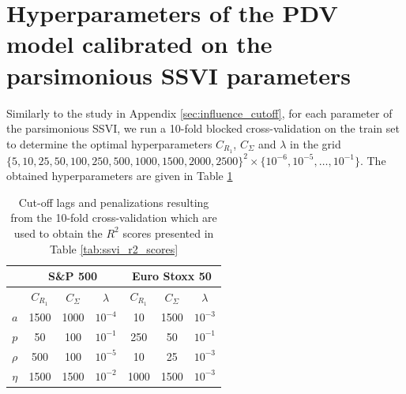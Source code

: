 \section{Hyperparameters of the PDV model calibrated on the parsimonious SSVI parameters}\label{sec:hyperparams_ssvi}
Similarly to the study in Appendix \ref{sec:influence_cutoff}, for each parameter of the parsimonious SSVI, we run a 10-fold blocked cross-validation on the train set to determine the optimal hyperparameters $C_{R_1}$, $C_{\Sigma}$ and $\lambda$ in the grid $\{5,10,25,50,100,250,500,1000,1500,2000,2500\}^2\times \{10^{-6},10^{-5},\dots,10^{-1}\}$. The obtained hyperparameters are given in Table \ref{tab:pssvi_hyperparameters}
\begin{table}[h]
    \centering
    \caption{Cut-off lags and penalizations resulting from the 10-fold cross-validation which are used to obtain the $R^2$ scores presented in Table \ref{tab:ssvi_r2_scores}}
    \label{tab:pssvi_hyperparameters}
    \begin{tabular}{@{}ccccccc@{}}
    \toprule
    & \multicolumn{3}{c}{S\&P 500} & \multicolumn{3}{c}{Euro Stoxx 50} \\ \toprule
        & $C_{R_1}$ & $C_{\Sigma}$ & $\lambda$ & $C_{R_1}$ & $C_{\Sigma}$ & $\lambda$   \\ \midrule
    $a$   &     1500 &  1000 & $10^{-4}$            & 10 & 1500 & $10^{-3}$        \\
    $p$   &     50 & 100 & $10^{-1}$           & 250 & 50 & $10^{-1}$        \\
    $\rho$ &  500 & 100 & $10^{-5}$        &   10 & 25 & $10^{-3}$             \\
    $\eta$ &    1500 & 1500 & $10^{-2}$ &    1000 & 1500 & $10^{-3}$             \\ \bottomrule
\end{tabular}
\end{table}
